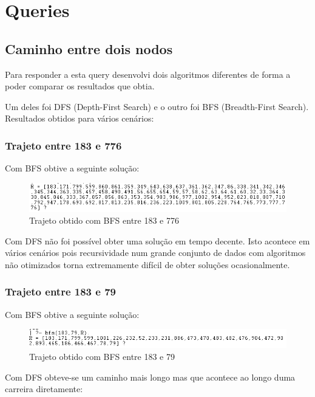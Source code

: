 \documentclass[20pt]{article}
\begin{document}
\newpage
\section{Queries}
\subsection{Caminho entre dois nodos}
Para responder a esta query desenvolvi dois algoritmos diferentes de forma a poder comparar os resultados que obtia.

Um deles foi DFS (Depth-First Search) e o outro foi BFS (Breadth-First Search). 
Resultados obtidos para vários cenários:

\subsubsection{Trajeto entre 183 e 776}
Com BFS obtive a seguinte solução:

\vspace{1cm}
\begin{figure}[H]
    \centering
    \includegraphics[scale=0.8]{images/bfs_183_776.png}
    \caption{Trajeto obtido com BFS entre 183 e 776}
\end{figure}

Com DFS não foi possível obter uma solução em tempo decente. Isto acontece em vários cenários pois recursividade num grande conjunto de dados com algoritmos não otimizados torna extremamente difícil de obter soluções ocasionalmente.

\subsubsection{Trajeto entre 183 e 79}
Com BFS obtive a seguinte solução:

\vspace{1cm}
\begin{figure}[H]
    \centering
    \includegraphics[scale=0.8]{images/bfs_183_79.png}
    \caption{Trajeto obtido com BFS entre 183 e 79}
\end{figure}

Com DFS obteve-se um caminho mais longo mas que acontece ao longo duma carreira diretamente:
\end{document}
